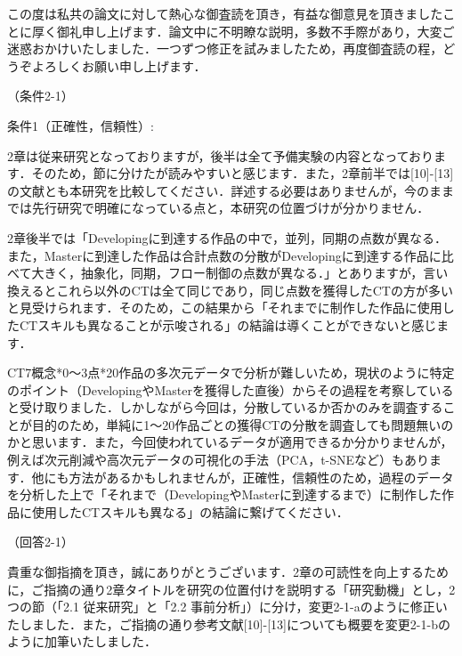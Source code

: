 \documentclass{jarticle} %
\def\subsection#1{ \vspace{1pc} {\gt #1} }
\begin{document}
この度は私共の論文に対して熱心な御査読を頂き，有益な御意見を頂きましたことに厚く御礼申し上げます．論文中に不明瞭な説明，多数不手際があり，大変ご迷惑おかけいたしました．一つずつ修正を試みましたため，再度御査読の程，どうぞよろしくお願い申し上げます．


\newpage
\subsection{（条件2-1）}

条件1（正確性，信頼性）: 

2章は従来研究となっておりますが，後半は全て予備実験の内容となっております．そのため，節に分けたが読みやすいと感じます．また，2章前半では[10]-[13]の文献とも本研究を比較してください．詳述する必要はありませんが，今のままでは先行研究で明確になっている点と，本研究の位置づけが分かりません．

2章後半では「Developingに到達する作品の中で，並列，同期の点数が異なる．また，Masterに到達した作品は合計点数の分散がDevelopingに到達する作品に比べて大きく，抽象化，同期，フロー制御の点数が異なる．」とありますが，言い換えるとこれら以外のCTは全て同じであり，同じ点数を獲得したCTの方が多いと見受けられます．そのため，この結果から「それまでに制作した作品に使用したCTスキルも異なることが示唆される」の結論は導くことができないと感じます．

CT7概念*0〜3点*20作品の多次元データで分析が難しいため，現状のように特定のポイント（DevelopingやMasterを獲得した直後）からその過程を考察していると受け取りました．しかしながら今回は，分散しているか否かのみを調査することが目的のため，単純に1〜20作品ごとの獲得CTの分散を調査しても問題無いのかと思います．また，今回使われているデータが適用できるか分かりませんが，例えば次元削減や高次元データの可視化の手法（PCA，t-SNEなど）もあります．他にも方法があるかもしれませんが，正確性，信頼性のため，過程のデータを分析した上で「それまで（DevelopingやMasterに到達するまで）に制作した作品に使用したCTスキルも異なる」の結論に繋げてください．

\subsection{（回答2-1）}

貴重な御指摘を頂き，誠にありがとうございます．2章の可読性を向上するために，ご指摘の通り2章タイトルを研究の位置付けを説明する「研究動機」とし，2つの節（「2.1 従来研究」と「2.2 事前分析」）に分け，変更2-1-aのように修正いたしました．また，ご指摘の通り参考文献[10]-[13]についても概要を変更2-1-bのように加筆いたしました．
\end{document}
